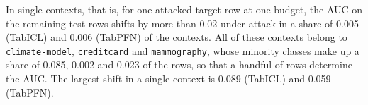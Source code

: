In single contexts, that is, for one attacked target row at one budget, the AUC on the remaining test rows shifts by more than 0.02 under attack in a share of 0.005 (TabICL) and 0.006 (TabPFN) of the contexts. All of these contexts belong to \texttt{climate-model}, \texttt{creditcard} and \texttt{mammography}, whose minority classes make up a share of 0.085, 0.002 and 0.023 of the rows, so that a handful of rows determine the AUC. The largest shift in a single context is 0.089 (TabICL) and 0.059 (TabPFN).
